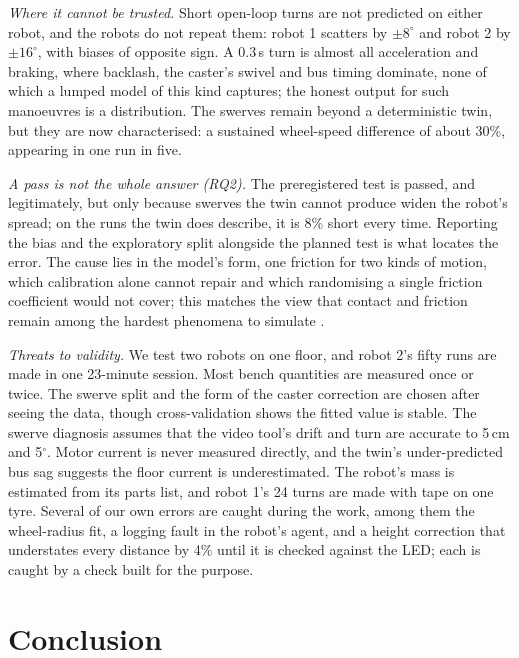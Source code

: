 \documentclass[conference,a4paper]{IEEEtran}
\begin{document}
\emph{Where it cannot be trusted.} Short open-loop turns are not predicted on
either robot, and the robots do not repeat them: robot 1 scatters by
$\pm8^\circ$ and robot 2 by $\pm16^\circ$, with biases of opposite sign. A
0.3\,s turn is almost all acceleration and braking, where backlash, the
caster's swivel and bus timing dominate, none of which a lumped model of this
kind captures; the honest output for such manoeuvres is a distribution. The
swerves remain beyond a deterministic twin, but they are now characterised:
a sustained wheel-speed difference of about 30\%, appearing in one run in five.

\emph{A pass is not the whole answer (RQ2).} The preregistered test is passed,
and legitimately, but only because swerves the twin cannot produce widen the
robot's spread; on the runs the twin does describe, it is 8\% short every
time. Reporting the bias and the exploratory split alongside the planned test
is what locates the error. The cause lies in the model's form, one friction
for two kinds of motion, which calibration alone cannot repair
\citep{kennedy2001bayesian} and which randomising a single friction
coefficient \citep{peng2018sim} would not cover; this matches the view
that contact and friction remain among the hardest phenomena to simulate
\citep{erez2015simulation,choi2021use}.

\emph{Threats to validity.} We test two robots on one floor, and robot 2's
fifty runs are made in one 23-minute session. Most bench quantities are
measured once or twice. The swerve split and the form of the caster
correction are chosen after seeing the data, though cross-validation shows the
fitted value is stable. The swerve diagnosis assumes that the video tool's
drift and turn are accurate to 5\,cm and 5$^\circ$. Motor current is never
measured directly, and the twin's under-predicted bus sag suggests the floor
current is underestimated. The robot's mass is estimated from its parts list,
and robot 1's 24 turns are made with tape on one tyre. Several of our own
errors are caught during the work, among them the wheel-radius fit, a logging
fault in the robot's agent, and a height correction that understates every
distance by 4\% until it is checked against the LED; each is caught by a
check built for the purpose.

\section{Conclusion}\label{sec:conclusion}
\end{document}
